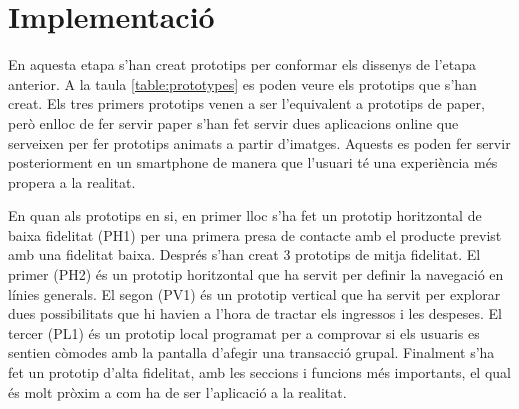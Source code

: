 
\section{Implementació}
En aquesta etapa s'han creat prototips per conformar els dissenys de l'etapa anterior. A la taula \ref{table:prototypes} es poden veure els prototips que s'han creat. Els tres primers prototips venen a ser l'equivalent a prototips de paper, però enlloc de fer servir paper s'han fet servir dues aplicacions online que serveixen per fer prototips animats a partir d'imatges. Aquests es poden fer servir posteriorment en un \gls{smartphone} de manera que l'usuari té una experiència més propera a la realitat.

En quan als prototips en si, en primer lloc s'ha fet un prototip horitzontal de baixa fidelitat (PH1) per una primera presa de contacte amb el producte previst amb una fidelitat baixa. Després s'han creat 3 prototips de mitja fidelitat. El primer (PH2) és un prototip horitzontal que ha servit per definir la navegació en línies generals. El segon (PV1) és un prototip vertical que ha servit per explorar dues possibilitats que hi havien a l'hora de tractar els ingressos i les despeses. El tercer (PL1) és un prototip local programat per a comprovar si els usuaris es sentien còmodes amb la pantalla d'afegir una transacció grupal. Finalment s'ha fet un prototip d'alta fidelitat, amb les seccions i funcions més importants, el qual és molt pròxim a com ha de ser l'aplicació a la realitat. 

